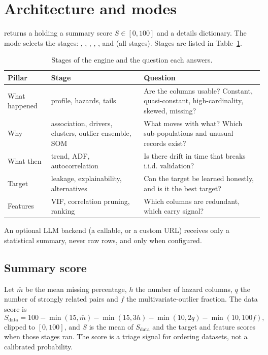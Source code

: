 \documentclass[conference]{IEEEtran}
\begin{document}
\section{Architecture and modes}\label{sec:arch}
 returns a  holding a summary score $S\in[0,100]$ and a details dictionary. The mode selects the stages: , , , , ,  and  (all stages). Stages are listed in Table~\ref{tab:stages}.
\begin{table}[t]\caption{Stages of the engine and the question each answers.}\label{tab:stages}\centering\scriptsize
\begin{tabular}{@{}p{1.2cm}p{2.2cm}p{4.3cm}@{}}\toprule
Pillar & Stage & Question \\\midrule
What happened & profile, hazards, tails & Are the columns usable? Constant, quasi-constant, high-cardinality, skewed, missing? \\
Why & association, drivers, clusters, outlier ensemble, SOM & What moves with what? Which sub-populations and unusual records exist? \\
What then & trend, ADF, autocorrelation & Is there drift in time that breaks i.i.d. validation? \\
Target & leakage, explainability, alternatives & Can the target be learned honestly, and is it the best target? \\
Features & VIF, correlation pruning, ranking & Which columns are redundant, which carry signal? \\\bottomrule
\end{tabular}\end{table}
An optional LLM backend (a callable,  or a custom URL) receives only a statistical summary, never raw rows, and only when configured.

\subsection{Summary score}
Let $\bar m$ be the mean missing percentage, $h$ the number of hazard columns, $q$ the number of strongly related pairs and $f$ the multivariate-outlier fraction. The data score is
\begin{equation}\label{eq:score}S_{\text{data}}=100-\min(15,\bar m)-\min(15,3h)-\min(10,2q)-\min(10,100f),\end{equation}
clipped to $[0,100]$, and $S$ is the mean of $S_{\text{data}}$ and the target and feature scores when those stages ran. The score is a triage signal for ordering datasets, not a calibrated probability.
\end{document}

